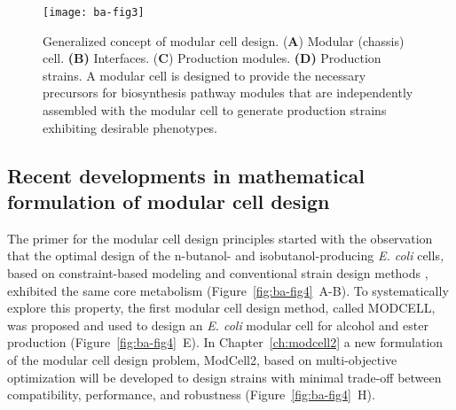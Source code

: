 \begin{figure}[p]
  \centering
  \texttt{[image: ba-fig3]}
    \caption[Generalized concept of modular cell design]{Generalized concept of modular cell design.
    (\textbf{A}) Modular (chassis) cell. \textbf{(B)} Interfaces.
(\textbf{C}) Production modules. \textbf{(D)} Production strains. A
modular cell is designed to provide the necessary precursors for
biosynthesis pathway modules that are independently assembled with the
modular cell to generate production strains exhibiting desirable
phenotypes.}
    \label{fig:ba-fig3}
\end{figure}

\subsection{Recent developments in mathematical formulation of modular cell design}


The primer for the modular cell design principles started with the observation \citep{trinh2012} that the optimal design of the n-butanol- and isobutanol-producing \emph{E.
coli} cells\emph{,} based on constraint-based modeling \citep{palsson2015} and conventional strain design methods \citep{trinh2009}, exhibited the same core metabolism (Figure~\ref{fig:ba-fig4}~A-B).
To systematically explore this property, the first modular cell design method, called MODCELL, was proposed and used to design an \emph{E.
coli} modular cell for alcohol and ester production \citep{trinh2015} (Figure~\ref{fig:ba-fig4}~E).
In Chapter~\ref{ch:modcell2} a new formulation of the modular cell design problem, ModCell2, based on multi-objective optimization will be developed to design strains with minimal trade-off between compatibility, performance, and robustness (Figure~\ref{fig:ba-fig4}~H).


